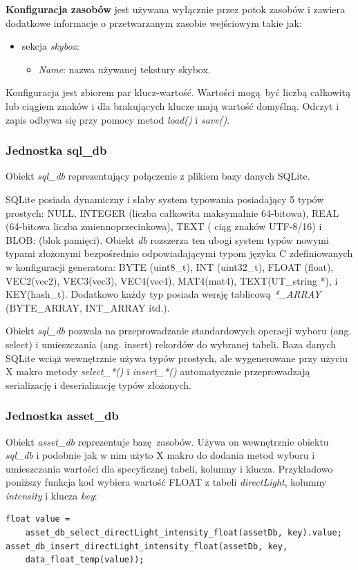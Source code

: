 \textbf{Konfiguracja zasobów} jest używana wyłącznie przez potok zasobów i zawiera dodatkowe informacje o przetwarzanym zasobie wejściowym takie jak:
\begin{itemize}
	\item sekcja \textit{skybox}:
	\begin{itemize}
		\item \textit{Name}: nazwa używanej tekstury skybox.
	\end{itemize}
\end{itemize}

Konfiguracja jest zbiorem par klucz-wartość.
Wartości mogą być liczbą całkowitą lub ciągiem znaków i dla brakujących klucze mają wartość domyślną.
Odczyt i zapis odbywa się przy pomocy metod \textit{load()} i \textit{save()}.


\subsubsection{Jednostka sql\_db}
Obiekt \textit{sql\_db} reprezentujący połączenie z plikiem bazy danych SQLite.

SQLite posiada dynamiczny i słaby system typowania posiadający 5 typów prostych:
NULL, INTEGER (liczba całkowita maksymalnie 64-bitowa), REAL (64-bitowa liczba zmiennoprzecinkowa), TEXT ( ciąg znaków UTF-8/16) i BLOB: (blok pamięci).
Obiekt \textit{db} rozszerza ten ubogi system typów nowymi typami złożonymi bezpośrednio odpowiadającymi typom języka C zdefiniowanych w konfiguracji generatora: BYTE (uint8\_t), INT (uint32\_t), FLOAT (float), VEC2(vec2), VEC3(vec3), VEC4(vec4), MAT4(mat4), TEXT(UT\_string *), i KEY(hash\_t).
Dodatkowo każdy typ posiada wersję tablicową \textit{*\_ARRAY} (BYTE\_ARRAY, INT\_ARRAY itd.).

Obiekt \textit{sql\_db} pozwala na przeprowadzanie standardowych operacji wyboru (ang. select) i umieszczania (ang. insert) rekordów do wybranej tabeli.
Baza danych SQLite wciąż wewnętrznie używa typów prostych, ale wygenerowane przy użyciu X makro metody \textit{select\_*()} i \textit{insert\_*()} automatycznie przeprowadzają serializację i deserializację typów złożonych.


\subsubsection{Jednostka asset\_db}
Obiekt \textit{asset\_db} reprezentuje bazę zasobów.
Używa on wewnętrznie obiektu \textit{sql\_db} i podobnie jak w nim użyto X makro do dodania metod wyboru i umieszczania wartości dla specyficznej tabeli, kolumny i klucza.
Przykładowo poniższy funkcja kod wybiera wartość FLOAT z tabeli \textit{directLight}, kolumny \textit{intensity} i klucza \textit{key}:
\lstset{language=C}
\begin{lstlisting}[caption={Deserializacja i serializacja wartości zmiennoprzecinkowej},captionpos=b]
float value =
	asset_db_select_directLight_intensity_float(assetDb, key).value;
asset_db_insert_directLight_intensity_float(assetDb, key,
	data_float_temp(value));
\end{lstlisting}

